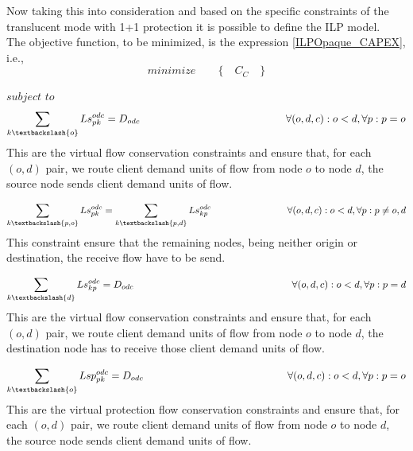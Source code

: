 Now taking this into consideration and based on the specific constraints of the translucent mode with 1+1 protection it is possible to define the ILP model.\\

The objective function, to be minimized, is the expression \ref{ILPOpaque_CAPEX}, i.e.,
\begin{equation*}
  minimize \qquad \Big\{ \quad C_C \quad \Big\}
\end{equation*}

$subject$ $to$
\begin{equation}
\sum_{k\textbackslash \{o\}} Ls_{pk}^{odc} = D_{odc} \qquad \qquad \qquad \qquad \qquad \qquad \qquad
\forall(o,d,c) : o < d, \forall p: p = o
\label{ILPTranslucp1}
\end{equation}
\noindent
This are the virtual flow conservation constraints and ensure that, for each $(o,d)$ pair, we route client demand units of flow from node $o$ to node $d$, the source node sends client demand units of flow.

\begin{equation}
\sum_{k\textbackslash \{p,o\}} Ls_{pk}^{odc} = \sum_{k\textbackslash \{p,d\}} Ls_{kp}^{odc} \qquad \qquad \qquad \qquad
\forall(o,d,c) : o < d, \forall p: p \neq o,d
\label{ILPTranslucp2}
\end{equation}
\noindent
This constraint ensure that the remaining nodes, being neither origin or destination, the receive flow have to be send.

\begin{equation}
\sum_{k\textbackslash \{d\}} Ls_{kp}^{odc} = D_{odc} \qquad \qquad \qquad \qquad \qquad \qquad \qquad \qquad
\forall(o,d,c) : o < d, \forall p: p = d
\label{ILPTranslucp3}
\end{equation}
\noindent
This are the virtual flow conservation constraints and ensure that, for each $(o,d)$ pair, we route client demand units of flow from node $o$ to node $d$, the destination node has to receive those client demand units of flow.

\begin{equation}
\sum_{k\textbackslash \{o\}} Lsp_{pk}^{odc} = D_{odc} \qquad \qquad \qquad \qquad \qquad \qquad \qquad
\forall(o,d,c) : o < d, \forall p: p = o
\label{ILPTranslucp1p}
\end{equation}
\noindent
This are the virtual protection flow conservation constraints and ensure that, for each $(o,d)$ pair, we route client demand units of flow from node $o$ to node $d$, the source node sends client demand units of flow.

